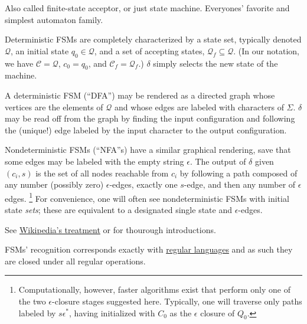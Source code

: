 Also called finite-state acceptor, or just state machine.  Everyones'
favorite and simplest automaton family.

Deterministic FSMs are completely characterized by a state set, typically
denoted $\mathcal{Q}$, an initial state $q_0 \in \mathcal{Q}$, and a set of
accepting states, $\mathcal{Q}_f \subseteq \mathcal{Q}$.  (In our notation,
we have $\mathcal{C} = \mathcal{Q}$, $c_0 = q_0$, and $\mathcal{C}_f =
\mathcal{Q}_f$.)  $\delta$ simply selects the new state of the machine.

A deterministic FSM (``DFA'') may be rendered as a directed graph whose
vertices are the elements of $\mathcal{Q}$ and whose edges are labeled with
characters of $\Sigma$.  $\delta$ may be read off from the graph by finding
the input configuration and following the (unique!) edge labeled by the
input character to the output configuration.

Nondeterministic FSMs (``NFA''s) have a similar graphical rendering, save
that some edges may be labeled with the empty string $\epsilon$.  The output
of $\delta$ given $(c_i, s)$ is the set of all nodes reachable from $c_i$ by
following a path composed of any number (possibly zero) $\epsilon$-edges,
exactly one $s$-edge, and then any number of $\epsilon$ edges.%
%
\footnote{Computationally, however, faster algorithms exist that perform
only one of the two $\epsilon$-closure stages suggested here.  Typically,
one will traverse only paths labeled by $s\epsilon^*$, having initialized
with $C_0$ as the $\epsilon$ closure of $Q_0$.} For convenience, one will
often see nondeterministic FSMs with initial state {\em sets}; these are
equivalent to a designated single state and $\epsilon$-edges.

See \href{http://wikipedia.org/Finite-state\_Machine}{Wikipedia's treatment}
or \cite[Ch. 1]{sipser:theorycomp} for thourough introductions.

FSMs' recognition corresponds exactly with
\href{http://wikipedia.org/Regular\_language}{regular languages} and as such
they are closed under all regular operations.


